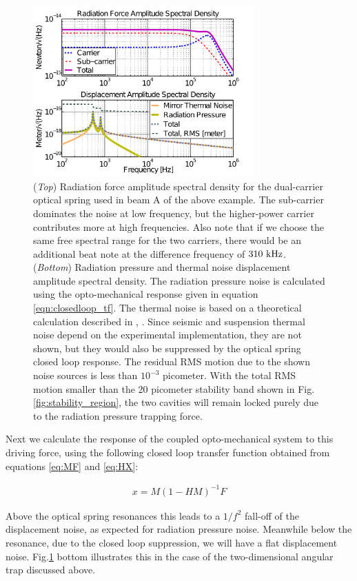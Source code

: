 \begin{figure}[htbp]
	\centering
		\includegraphics[width=8.5cm]{./figures/trap_radPresA_paper2.pdf}
	\caption[Radiation Pressure Noise]{
        (\emph{Top}) Radiation force amplitude spectral density for the dual-carrier optical spring used in beam A of the above example. The sub-carrier dominates the noise at low frequency, but the higher-power carrier contributes more at high frequencies. Also note that if we choose the same free spectral range for the two carriers, there would be an additional beat note at the difference frequency of $310~{\rm kHz}$. (\emph{Bottom})  Radiation pressure and thermal noise displacement amplitude spectral density. The radiation pressure noise is calculated using the opto-mechanical response given in equation \ref{eqn:closedloop_tf}. The thermal noise is based on a theoretical calculation described in \cite{Saulson90}, \cite{Ballmer13}. Since seismic and suspension thermal noise depend on the experimental implementation, they are not shown, but they would also be suppressed by the optical spring closed loop response. The residual RMS motion due to the shown noise sources is less than $10^{-3}$ picometer. With the total RMS motion smaller than the 20 picometer stability band shown in Fig.\ref{fig:stability_region}, the two cavities will remain locked purely due to the radiation pressure trapping force.}
	\label{fig:RFASD}
\end{figure}

Next we calculate the response of the coupled opto-mechanical system to this driving force, using the following closed loop transfer function obtained from equations \ref{eq:MF} and \ref{eq:HX}:

\begin{eqnarray}
\label{eqn:closedloop_tf}
x = {M}({1-HM})^{-1}F
\end{eqnarray}

Above the optical spring resonances this leads to a $1/f^2$ fall-off of the displacement noise, as expected for radiation pressure noise. Meanwhile below the resonance, due to the closed loop suppression, we will have a flat displacement noise. %
Fig.\ref{fig:RFASD} bottom illustrates this in the case of the two-dimensional angular trap discussed above.

